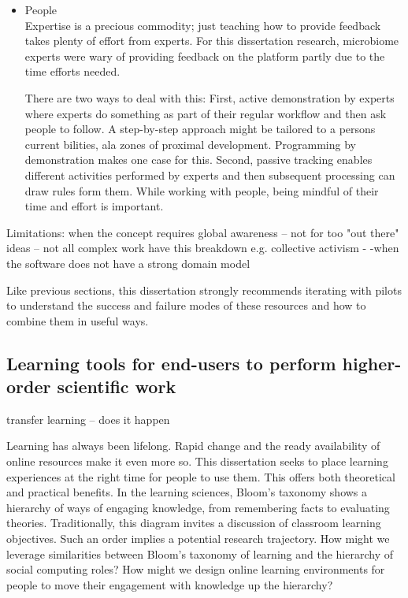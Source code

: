 \begin{itemize}
\item People \\
Expertise is a precious commodity; just teaching how to provide feedback takes plenty of effort from experts. For this dissertation research, microbiome experts were wary of providing feedback on the platform partly due to the time efforts needed. 

There are two ways to deal with this: First, active demonstration by experts where experts do something as part of their regular workflow and then ask people to follow. A step-by-step approach might be tailored to a person\textquotesingle s current bilities, ala zones of proximal development. Programming by demonstration makes one case for this. Second, passive tracking enables different activities performed by experts and then subsequent processing can draw rules form them. While working with people, being mindful of their time and effort is important.
\end{itemize}

Limitations: when the concept requires global awareness -- not for too "out there" ideas -- not all complex work have this breakdown e.g. collective activism - -when the software does not have a strong domain model

Like previous sections, this dissertation strongly recommends iterating with pilots to understand the success and failure modes of these resources and how to combine them in useful ways.

\subsection{Learning tools for end-users to perform higher-order scientific work}
transfer learning -- does it happen

Learning has always been lifelong. Rapid change and the ready availability of online resources make it even more so. This dissertation seeks to place learning experiences at the right time for people to use them. This offers both theoretical and practical benefits. In the learning sciences, Bloom’s taxonomy shows a hierarchy of ways of engaging knowledge, from remembering facts to evaluating theories. Traditionally, this diagram invites a discussion of classroom learning objectives. Such an order implies a potential research trajectory. How might we leverage similarities between Bloom’s taxonomy of learning and the hierarchy of social computing roles? How might we design online learning environments for people to move their engagement with knowledge up the hierarchy? 

